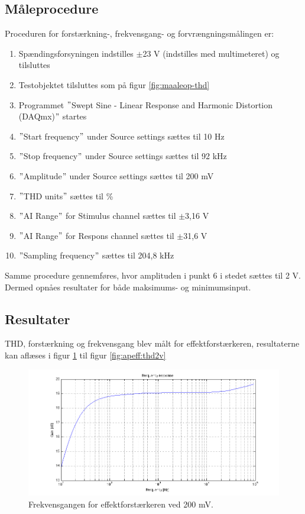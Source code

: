 \subsection*{Måleprocedure}
Proceduren for forstærkning-, frekvensgang- og forvrængningsmålingen er:

\begin{enumerate}
\item Spændingsforsyningen indstilles $\pm$23 V (indstilles med multimeteret) og tilsluttes
\item Testobjektet tilsluttes som på figur \ref{fig:maaleop-thd}
\item Programmet $"$Swept Sine - Linear Response and Harmonic Distortion (DAQmx)$"$ startes
\item $"$Start frequency$"$ under Source settings sættes til 10 Hz
\item $"$Stop frequency$"$ under Source settings sættes til 92 kHz
\item $"$Amplitude$"$ under Source settings sættes til 200 mV
\item $"$THD units$"$ sættes til \%
\item $"$AI Range$"$ for Stimulus channel sættes til $\pm$3,16 V
\item $"$AI Range$"$ for Respons channel sættes til $\pm$31,6 V
\item $"$Sampling frequency$"$ sættes til 204,8 kHz
\end{enumerate}

Samme procedure gennemføres, hvor amplituden i punkt 6 i stedet sættes til 2 V. Dermed opnåes resultater for både maksimums- og minimumsinput. 


\subsection*{Resultater}
THD, forstærkning og frekvensgang blev målt for effektforstærkeren, resultaterne kan aflæses i figur \ref{fig:apeff:frek200mv} til figur \ref{fig:apeff:thd2v} 

\begin{figure}[h]
\centering
\includegraphics[width=\textwidth]{maalerapporter/effektforstaerker/200mV-45mA-uden-modstand-frek.png}
\caption{Frekvensgangen for effektforstærkeren ved 200 mV.}
\label{fig:apeff:frek200mv}
\end{figure}

